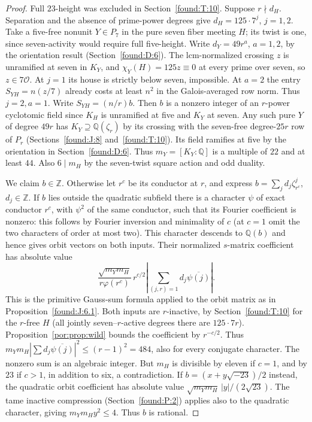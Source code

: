 \documentclass[11pt,a4paper]{article}
\numberwithin{equation}{section}
\theoremstyle{remark}
\newcommand{\ZZ}{\mathbb Z}
\begin{document}
\begin{proof}
Full $23$-height was excluded in Section~\ref{found:T:10}. Suppose $r\nmid d_H$. Separation and the absence of prime-power degrees give $d_H=125\cdot7^j$, $j=1,2$. Take a five-free nonunit $Y\in P_7$ in the pure seven fiber meeting $H$; its twist is one, since seven-activity would require full five-height. Write $d_Y=49r^a$, $a=1,2$, by the orientation result (Section~\ref{found:D:6}). The lcm-normalized crossing $z$ is unramified at seven in $K_Y$, and $\chi_Y(H)=125z\equiv0$ at every prime over seven, so $z\in7\mathcal O$. At $j=1$ its house is strictly below seven, impossible. At $a=2$ the entry $S_{YH}=n(z/7)$ already costs at least $n^2$ in the Galois-averaged row norm. Thus $j=2,a=1$. Write $S_{YH}=(n/r)b$. Then $b$ is a nonzero integer of an $r$-power cyclotomic field since $K_H$ is unramified at five and $K_Y$ at seven. Any such pure $Y$ of degree $49r$ has $K_Y\supseteq\mathbb Q(\zeta_r)$ by its crossing with the seven-free degree-$25r$ row of $P_r$ (Sections~\ref{found:J:8} and~\ref{found:T:10}). Its field ramifies at five by the orientation in Section~\ref{found:D:6}. Thus $m_Y=[K_Y:\mathbb Q]$ is a multiple of $22$ and at least $44$. Also $6\mid m_H$ by the seven-twist square action and odd duality.

We claim $b\in\ZZ$. Otherwise let $r^c$ be its conductor at $r$, and express $b=\sum_j d_j\zeta_{r^c}^j$, $d_j\in\ZZ$. If $b$ lies outside the quadratic subfield there is a character $\psi$ of exact conductor $r^c$, with $\psi^2$ of the same conductor, such that its Fourier coefficient is nonzero: this follows by Fourier inversion and minimality of $c$ (at $c=1$ omit the two characters of order at most two). This character descends to $\mathbb Q(b)$ and hence gives orbit vectors on both inputs. Their normalized $s$-matrix coefficient has absolute value
\[
 \frac{\sqrt{m_Ym_H}}{r\varphi(r^c)}\, r^{c/2}
     \left|\sum_{(j,r)=1}d_j\overline{\psi(j)}\right|.
\]
This is the primitive Gauss-sum formula applied to the orbit matrix as in Proposition~\ref{found:J:6.1}. Both inputs are $r$-inactive, by Section~\ref{found:T:10} for the $r$-free $H$ (all jointly seven--$r$-active degrees there are $125\cdot7r$). Proposition~\ref{por:prop:wild} bounds the coefficient by $r^{-c/2}$. Thus $m_Ym_H|\sum d_j\overline{\psi(j)}|^2\le (r-1)^2=484$, also for every conjugate character. The nonzero sum is an algebraic integer. But $m_H$ is divisible by eleven if $c=1$, and by $23$ if $c>1$, in addition to six, a contradiction. If $b=(x+y\sqrt{-23})/2$ instead, the quadratic orbit coefficient has absolute value $\sqrt{m_Ym_H}\,|y|/(2\sqrt{23})$. The tame inactive compression (Section~\ref{found:P:2}) applies also to the quadratic character, giving $m_Ym_H y^2\le4$. Thus $b$ is rational.


\end{proof}
\end{document}
